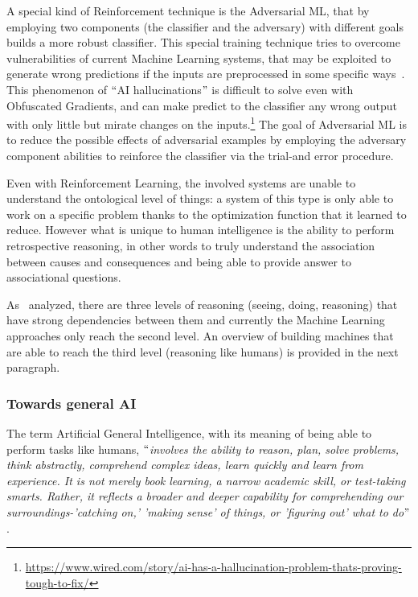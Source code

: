 A special kind of Reinforcement technique is the Adversarial ML, that by employing two components (the classifier and the adversary) with different goals builds a more robust classifier. This special training technique tries to overcome vulnerabilities of current Machine Learning systems, that may be exploited to generate wrong predictions if the inputs are preprocessed in some specific ways~\cite{athalye2018obfuscated}. This phenomenon of $``$AI hallucinations$"$  is difficult to solve even with Obfuscated Gradients, and can make predict to the classifier any wrong output with only little but mirate changes on the inputs.\footnote{\url{https://www.wired.com/story/ai-has-a-hallucination-problem-thats-proving-tough-to-fix/}} The goal of Adversarial ML is to reduce the possible effects of adversarial examples by employing the adversary component abilities to reinforce the classifier via the trial-and error procedure.

Even with Reinforcement Learning, the involved systems are unable to understand the ontological level of things: a system of this type is only able to work on a specific problem thanks to the optimization function that it learned to reduce. However what is unique to human intelligence is the ability to perform retrospective reasoning, in other words to truly understand the association between causes and consequences and being able to provide answer to associational questions.

As~\cite{pearl2018theoretical} analyzed, there are three levels of reasoning (seeing, doing, reasoning) that have strong dependencies between them and currently the Machine Learning approaches only reach the second level. An overview of building machines that are able to reach the third level (reasoning like humans) is provided in the next paragraph.

\subsubsection{Towards general AI}
\label{generalAI}

The term Artificial General Intelligence, with its meaning of being able to perform tasks like humans, $``$\textit{involves the ability to reason, plan, solve problems, think abstractly, comprehend complex ideas, learn quickly and learn from experience. It is not merely book learning, a narrow academic skill, or test-taking smarts. Rather, it reflects a broader and deeper capability for comprehending our surroundings-'catching on,' 'making sense' of things, or 'figuring out' what to do}$"$ .~\cite{gottfredson1997mainstream}

